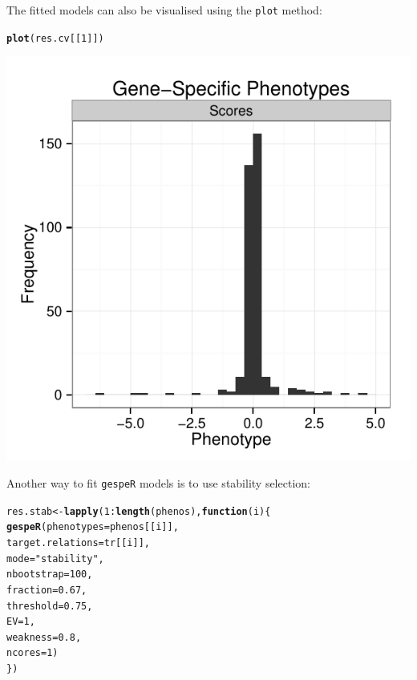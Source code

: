 \documentclass{article}\usepackage[]{graphicx}\usepackage[]{color}
\makeatletter
\newcommand{\hlnum}[1]{\textcolor[rgb]{0.686,0.059,0.569}{#1}}%
\newcommand{\hlstr}[1]{\textcolor[rgb]{0.192,0.494,0.8}{#1}}%
\newcommand{\hlopt}[1]{\textcolor[rgb]{0,0,0}{#1}}%
\newcommand{\hlstd}[1]{\textcolor[rgb]{0.345,0.345,0.345}{#1}}%
\newcommand{\hlkwa}[1]{\textcolor[rgb]{0.161,0.373,0.58}{\textbf{#1}}}%
\newcommand{\hlkwb}[1]{\textcolor[rgb]{0.69,0.353,0.396}{#1}}%
\newcommand{\hlkwc}[1]{\textcolor[rgb]{0.333,0.667,0.333}{#1}}%
\newcommand{\hlkwd}[1]{\textcolor[rgb]{0.737,0.353,0.396}{\textbf{#1}}}%
\newenvironment{kframe}{%
 \def\at@end@of@kframe{}%
 \ifinner\ifhmode%
  \def\at@end@of@kframe{\end{minipage}}%
  \begin{minipage}{\columnwidth}%
 \fi\fi%
 \def\FrameCommand##1{\hskip\@totalleftmargin \hskip-\fboxsep
 \colorbox{shadecolor}{##1}\hskip-\fboxsep
     \hskip-\linewidth \hskip-\@totalleftmargin \hskip\columnwidth}%
 \MakeFramed {\advance\hsize-\width
   \@totalleftmargin\z@ \linewidth\hsize
   \@setminipage}}%
 {\par\unskip\endMakeFramed%
 \at@end@of@kframe}
\newenvironment{knitrout}{}{} %
\makeatother
\begin{document}
The fitted models can also be visualised using the \texttt{plot} method:
\begin{knitrout}
\color{fgcolor}\begin{kframe}
\begin{alltt}
  \hlkwd{plot}\hlstd{(res.cv[[}\hlnum{1}\hlstd{]])}
\end{alltt}


{\ttfamily\noindent\itshape\color{messagecolor}{\#\# stat\_bin: binwidth defaulted to range/30. Use 'binwidth = x' to adjust this.}}\end{kframe}

{\centering \includegraphics[width=.75\textwidth]{tmp/gespeR-plot_cv-1} 

}



\end{knitrout}


Another way to fit \texttt{gespeR} models is to use stability selection:
\begin{knitrout}
\color{fgcolor}\begin{kframe}
\begin{alltt}
  \hlstd{res.stab} \hlkwb{<-} \hlkwd{lapply}\hlstd{(}\hlnum{1}\hlopt{:}\hlkwd{length}\hlstd{(phenos),} \hlkwa{function}\hlstd{(}\hlkwc{i}\hlstd{) \{}
    \hlkwd{gespeR}\hlstd{(}\hlkwc{phenotypes} \hlstd{= phenos[[i]],}
      \hlkwc{target.relations} \hlstd{= tr[[i]],}
      \hlkwc{mode} \hlstd{=} \hlstr{"stability"}\hlstd{,}
      \hlkwc{nbootstrap} \hlstd{=} \hlnum{100}\hlstd{,}
      \hlkwc{fraction} \hlstd{=} \hlnum{0.67}\hlstd{,}
      \hlkwc{threshold} \hlstd{=} \hlnum{0.75}\hlstd{,}
      \hlkwc{EV} \hlstd{=} \hlnum{1}\hlstd{,}
      \hlkwc{weakness} \hlstd{=} \hlnum{0.8}\hlstd{,}
      \hlkwc{ncores} \hlstd{=} \hlnum{1}\hlstd{)}
  \hlstd{\})}
\end{alltt}
\end{kframe}
\end{knitrout}
\end{document}
